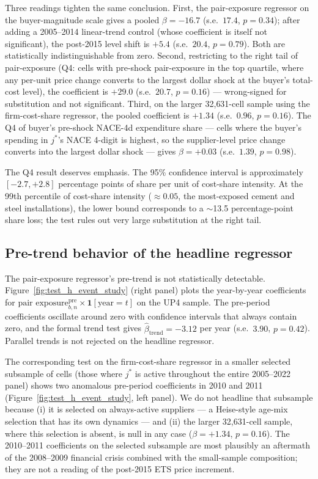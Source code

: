 Three readings tighten the same conclusion. First, the pair-exposure regressor on the buyer-magnitude scale gives a pooled $\beta = -16.7$ (s.e.\ $17.4$, $p = 0.34$); after adding a 2005--2014 linear-trend control (whose coefficient is itself not significant), the post-2015 level shift is $+5.4$ (s.e.\ $20.4$, $p = 0.79$). Both are statistically indistinguishable from zero. Second, restricting to the right tail of pair-exposure (Q4: cells with pre-shock pair-exposure in the top quartile, where any per-unit price change converts to the largest dollar shock at the buyer's total-cost level), the coefficient is $+29.0$ (s.e.\ $20.7$, $p = 0.16$) --- wrong-signed for substitution and not significant. Third, on the larger 32{,}631-cell sample using the firm-cost-share regressor, the pooled coefficient is $+1.34$ (s.e.\ $0.96$, $p = 0.16$). The Q4 of buyer's pre-shock NACE-4d expenditure share --- cells where the buyer's spending in $j^*$'s NACE 4-digit is highest, so the supplier-level price change converts into the largest dollar shock --- gives $\beta = +0.03$ (s.e.\ $1.39$, $p = 0.98$).

The Q4 result deserves emphasis. The 95\% confidence interval is approximately $[-2.7, +2.8]$ percentage points of share per unit of cost-share intensity. At the 99th percentile of cost-share intensity ($\approx 0.05$, the most-exposed cement and steel installations), the lower bound corresponds to a $\sim$13.5 percentage-point share loss; the test rules out very large substitution at the right tail.

\subsection{Pre-trend behavior of the headline regressor}

The pair-exposure regressor's pre-trend is not statistically detectable. Figure~\ref{fig:test_h_event_study} (right panel) plots the year-by-year coefficients for $\text{pair exposure}_{b,n}^{\text{pre}} \times \mathbf{1}[\text{year}=t]$ on the UP4 sample. The pre-period coefficients oscillate around zero with confidence intervals that always contain zero, and the formal trend test gives $\widehat{\beta}_{\text{trend}} = -3.12$ per year (s.e.\ $3.90$, $p = 0.42$). Parallel trends is not rejected on the headline regressor.

The corresponding test on the firm-cost-share regressor in a smaller selected subsample of cells (those where $j^*$ is active throughout the entire 2005--2022 panel) shows two anomalous pre-period coefficients in 2010 and 2011 (Figure~\ref{fig:test_h_event_study}, left panel). We do not headline that subsample because (i) it is selected on always-active suppliers --- a Heise-style age-mix selection that has its own dynamics --- and (ii) the larger 32{,}631-cell sample, where this selection is absent, is null in any case ($\beta = +1.34$, $p = 0.16$). The 2010--2011 coefficients on the selected subsample are most plausibly an aftermath of the 2008--2009 financial crisis combined with the small-sample composition; they are not a reading of the post-2015 ETS price increment.

